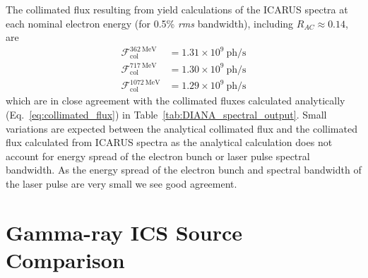 \documentclass[../main.tex]{subfiles}
\begin{document}
The collimated flux resulting from yield calculations of the \textsc{ICARUS} spectra at each nominal electron energy (for 0.5\% \textit{rms} bandwidth), including $R_{AC} \approx 0.14$, are
\begin{align}
\mathcal{F}_{\mathrm{col}}^{362~\si{\mega\electronvolt}} &= 1.31\times 10^{9}~\mathrm{ph}/\si{\second} \\
\mathcal{F}_{\mathrm{col}}^{717~\si{\mega\electronvolt}} &= 1.30\times 10^{9}~\mathrm{ph}/\si{\second} \\
\mathcal{F}_{\mathrm{col}}^{1072~\si{\mega\electronvolt}} &= 1.29\times 10^{9}~\mathrm{ph}/\si{\second}
\end{align}
which are in close agreement with the collimated fluxes calculated analytically (Eq.~\ref{eq:collimated_flux}) in Table~\ref{tab:DIANA_spectral_output}. Small variations are expected between the analytical collimated flux and the collimated flux calculated from \textsc{ICARUS} spectra as the analytical calculation does not account for energy spread of the electron bunch or laser pulse spectral bandwidth. As the energy spread of the electron bunch and spectral bandwidth of the laser pulse are very small we see good agreement.

\section{Gamma-ray ICS Source Comparison}
\label{sec:gamma_ICS_comparison}
\end{document}
